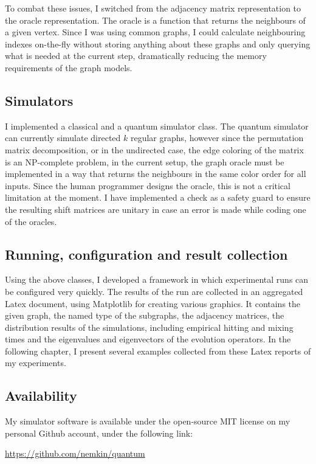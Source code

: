 To combat these issues, I switched from the adjacency matrix representation to the oracle representation. The oracle is a function that returns the neighbours of a given vertex. Since I was using common graphs, I could calculate neighbouring indexes on-the-fly without storing anything about these graphs and only querying what is needed at the current step, dramatically reducing the memory requirements of the graph models.

\subsection{Simulators}

I implemented a classical and a quantum simulator class. The quantum simulator can currently simulate directed $k$ regular graphs, however since the permutation matrix decomposition, or in the undirected case, the edge coloring of the matrix is an NP-complete problem, in the current setup, the graph oracle must be implemented in a way that returns the neighbours in the same color order for all inputs. Since the human programmer designs the oracle, this is not a critical limitation at the moment. I have implemented a check as a safety guard to ensure the resulting shift matrices are unitary in case an error is made while coding one of the oracles.

\subsection{Running, configuration and result collection}

Using the above classes, I developed a framework in which experimental runs can be configured very quickly. The results of the run are collected in an aggregated Latex document, using Matplotlib for creating various graphics. It contains the given graph, the named type of the subgraphs, the adjacency matrices, the distribution results of the simulations, including empirical hitting and mixing times and the eigenvalues and eigenvectors of the evolution operators. In the following chapter, I present several examples collected from these Latex reports of my experiments.

\subsection{Availability}

My simulator software is available under the open-source MIT license on my personal Github account, under the following link:

\url{https://github.com/nemkin/quantum}